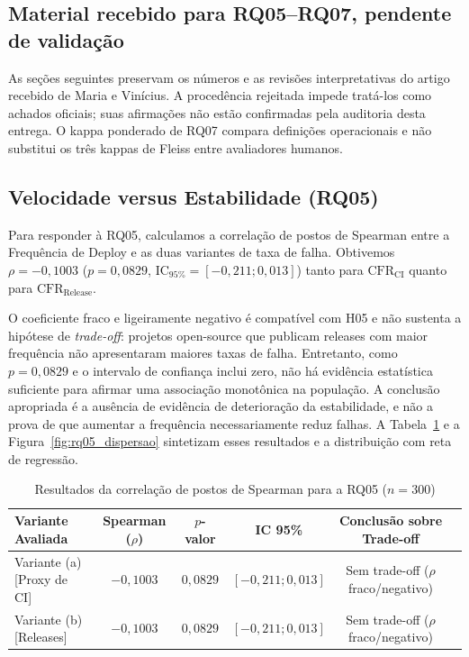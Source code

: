 \documentclass[12pt]{article}
\begin{document}
\subsection*{Material recebido para RQ05--RQ07, pendente de validação}
As seções seguintes preservam os números e as revisões interpretativas do artigo recebido de Maria e Vinícius. A procedência rejeitada impede tratá-los como achados oficiais; suas afirmações não estão confirmadas pela auditoria desta entrega. O kappa ponderado de RQ07 compara definições operacionais e não substitui os três kappas de Fleiss entre avaliadores humanos.

\subsection{Velocidade versus Estabilidade (RQ05)}
Para responder à RQ05, calculamos a correlação de postos de Spearman entre a Frequência de Deploy e as duas variantes de taxa de falha. Obtivemos $\rho = -0{,}1003$ ($p = 0{,}0829$, $\text{IC}_{95\%} = [-0{,}211; 0{,}013]$) tanto para $\text{CFR}_{\text{CI}}$ quanto para $\text{CFR}_{\text{Release}}$. 

O coeficiente fraco e ligeiramente negativo é compatível com H05 e não sustenta a hipótese de \textit{trade-off}: projetos open-source que publicam releases com maior frequência não apresentaram maiores taxas de falha. Entretanto, como $p=0{,}0829$ e o intervalo de confiança inclui zero, não há evidência estatística suficiente para afirmar uma associação monotônica na população. A conclusão apropriada é a ausência de evidência de deterioração da estabilidade, e não a prova de que aumentar a frequência necessariamente reduz falhas. A Tabela~\ref{tab:rq05_spearman} e a Figura~\ref{fig:rq05_dispersao} sintetizam esses resultados e a distribuição com reta de regressão.

\begin{table}[ht]
\centering
\caption{Resultados da correlação de postos de Spearman para a RQ05 ($n=300$)}
\label{tab:rq05_spearman}
\small
\begin{tabular}{lccccc}
\toprule
\textbf{Variante Avaliada} & \textbf{Spearman ($\rho$)} & \textbf{$p$-valor} & \textbf{IC 95\%} & \textbf{Conclusão sobre Trade-off} \\
\midrule
Variante (a) [Proxy de CI] & $-0{,}1003$ & $0{,}0829$ & $[-0{,}211; 0{,}013]$ & Sem trade-off ($\rho$ fraco/negativo) \\
Variante (b) [Releases] & $-0{,}1003$ & $0{,}0829$ & $[-0{,}211; 0{,}013]$ & Sem trade-off ($\rho$ fraco/negativo) \\
\bottomrule
\end{tabular}
\end{table}
\end{document}
